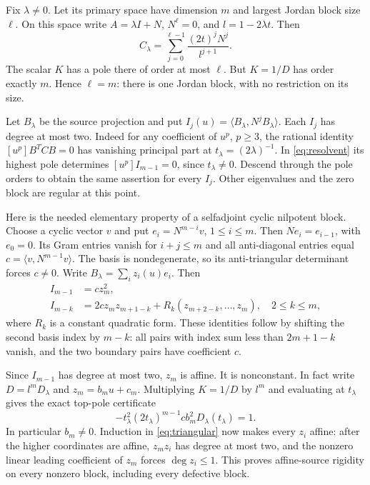 \documentclass[11pt]{article}
\theoremstyle{definition}\newtheorem{definition}[theorem]{Definition}
\theoremstyle{remark}\newtheorem{remark}[theorem]{Remark}
\begin{document}
Fix $\lambda\ne0$. Let its primary space have dimension $m$
and largest Jordan block size $\ell$. On this space write
$A=\lambda I+N$, $N^\ell=0$, and $l=1-2\lambda t$. Then
\begin{equation}\label{eq:resolvent}
 C_\lambda=\sum_{j=0}^{\ell-1}
             \frac{(2t)^jN^j}{l^{j+1}}.
\end{equation}
The scalar $K$ has a pole there of order at most $\ell$.
But $K=1/D$ has order exactly $m$. Hence $\ell=m$: there is
one Jordan block, with no restriction on its size.

Let $B_\lambda$ be the source projection and put
$I_j(u)=\langle B_\lambda,N^jB_\lambda\rangle$. Each $I_j$
has degree at most two. Indeed for any coefficient of $u^p$,
$p\ge3$, the rational identity $[u^p]B^TCB=0$ has vanishing
principal part at $t_\lambda=(2\lambda)^{-1}$. In
\eqref{eq:resolvent} its highest pole determines
$[u^p]I_{m-1}=0$, since $t_\lambda\ne0$. Descend through the
pole orders to obtain the same assertion for every $I_j$.
Other eigenvalues and the zero block are regular at this point.

Here is the needed elementary property of a selfadjoint cyclic
nilpotent block. Choose a cyclic vector $v$ and put
$e_i=N^{m-i}v$, $1\le i\le m$. Then $Ne_i=e_{i-1}$,
with $e_0=0$. Its Gram entries vanish for $i+j\le m$ and
all anti-diagonal entries equal
$c=\langle v,N^{m-1}v\rangle$. The basis is nondegenerate,
so its anti-triangular determinant forces $c\ne0$.
Write $B_\lambda=\sum_i z_i(u)e_i$. Then
\begin{align}
 I_{m-1}&=c z_m^2,\\
 I_{m-k}&=2c z_m z_{m+1-k}
              +R_k(z_{m+2-k},\ldots,z_m),\quad 2\le k\le m,
 \label{eq:triangular}
\end{align}
where $R_k$ is a constant quadratic form. These identities
follow by shifting the second basis index by $m-k$: all pairs
with index sum less than $2m+1-k$ vanish, and the two boundary
pairs have coefficient $c$.

Since $I_{m-1}$ has degree at most two, $z_m$ is affine.
It is nonconstant. In fact write $D=l^mD_\lambda$ and
$z_m=b_m u+c_m$. Multiplying $K=1/D$ by $l^m$ and evaluating
at $t_\lambda$ gives the exact top-pole certificate
\begin{equation}\label{eq:toppole}
 -t_\lambda^2(2t_\lambda)^{m-1}
          c b_m^2 D_\lambda(t_\lambda)=1.
\end{equation}
In particular $b_m\ne0$. Induction in \eqref{eq:triangular}
now makes every $z_i$ affine: after the higher coordinates
are affine, $z_mz_i$ has degree at most two, and the nonzero
linear leading coefficient of $z_m$ forces $\deg z_i\le1$.
This proves affine-source rigidity on every nonzero block,
including every defective block.
\end{document}
